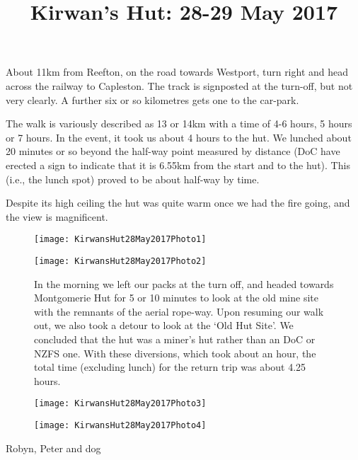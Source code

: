 \documentclass[12pt]{article} %
\title{Kirwan's Hut: 28-29 May 2017}
\makeatletter
\renewcommand{\maketitle}{%
  {\bfseries{\scshape{\Large{\@title\par}}}}
}
\makeatother
\begin{document}
  \maketitle
  
About 11km from Reefton, on the road towards Westport, turn right and head across the railway to Capleston.  The track is signposted at the turn-off, but not very clearly.  A further six or so kilometres gets one to the car-park.

The walk is variously described as 13 or 14km with a time of 4-6 hours, 5 hours or 7 hours.  In the event, it took us about 4 hours to the hut.  We lunched about 20 minutes or so beyond the half-way point measured by distance (DoC have erected a sign to indicate that it is 6.55km from the start and to the hut).  This (i.e., the lunch spot) proved to be about half-way by time.

Despite its high ceiling the hut was quite warm once we had the fire going, and the view is magnificent.

\begin{figure}[ht]
\begin{minipage}{.5\linewidth}
\begin{flushleft}
   \texttt{[image: KirwansHut28May2017Photo1]}
\end{flushleft}
\end{minipage}
\begin{minipage}{.5\linewidth}
\begin{flushright}
    \texttt{[image: KirwansHut28May2017Photo2]}
\end{flushright}
\end{minipage}

In the morning we left our packs at the turn off, and headed towards Montgomerie Hut for 5 or 10 minutes to look at the old mine site with the remnants of the aerial rope-way.  Upon resuming our walk out, we also took a detour to look at the  `Old Hut Site'.  We concluded that the hut was a miner's hut rather than an DoC or NZFS one.  With these diversions, which took about an hour, the total time (excluding lunch) for the return trip was about 4.25 hours.

\begin{minipage}{.55\linewidth}
\begin{flushleft}
   \texttt{[image: KirwansHut28May2017Photo3]}
\end{flushleft}
\end{minipage}
\begin{minipage}{.45\linewidth}
\begin{flushright}
    \texttt{[image: KirwansHut28May2017Photo4]}
\end{flushright}
\end{minipage}
\end{figure}

\begin{flushright}
Robyn, Peter and dog
\end{flushright}
\end{document}
